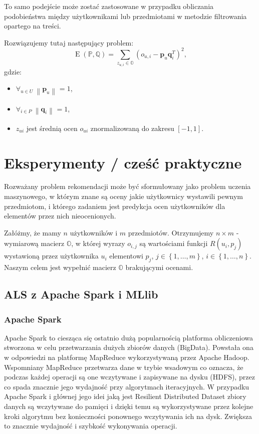 \documentclass[12pt,a4paper]{report}
\newcommand{\set}[1]{\left\lbrace {#1} \right\rbrace}
\newcommand{\norm}[2][]{\left\| {#2} \right\|_{#1}}
\newcommand{\e}[1]{\operatorname{E}\left({#1} \right)}
\begin{document}
To samo podejście może zostać zastosowane w przypadku obliczania podobieństwa między użytkownikami lub przedmiotami w metodzie filtrowania opartego na treści.

Rozwiązujemy tutaj następujący problem:
$$
\e{\mathbb{P}, \mathbb{Q}} = \sum_{z_{u,i} \in \mathbb{O}}(o_{u,i} - \mathbf{p}_u\mathbf{q}_i^T)^2,
$$
gdzie:
\begin{itemize}
\item $\forall_{u \in \mathit{U}} \: \norm{\mathbf{p}_u} = 1$,
\item $\forall_{i \in \mathit{P}} \: \norm{\mathbf{q}_i} = 1$,
\item $z_{ui}$ jest średnią ocen $o_{ui}$ znormalizowaną do zakresu $[-1,1]$.
\end{itemize}

\chapter{Eksperymenty / cześć praktyczne}

Rozważany problem rekomendacji może być sformułowany jako problem uczenia maszynowego, w którym znane są oceny jakie użytkownicy wystawili pewnym przedmiotom, i którego zadaniem jest predykcja ocen użytkowników dla elementów przez nich nieocenionych. 

Załóżmy, że mamy $n$ użytkowników i $m$ przedmiotów. Otrzymujemy $n \times m$ - wymiarową macierz $\mathbb{O}$, w której wyrazy $o_{i,j}$ są wartościami funkcji $R(u_i,p_j)$ wystawioną przez użytkownika $u_i$ elementowi $p_j$, $j \in \set{1, \ldots, m}$, $i \in \set{1, \ldots, n}$. Naszym celem jest wypełnić macierz $\mathbb{O}$ brakującymi ocenami. 


\section{ALS z Apache Spark i MLlib}
\subsection{Apache Spark}
Apache Spark to ciesząca się ostatnio dużą popularnością platforma obliczeniowa stworzona w celu przetwarzania dużych zbiorów danych (BigData). Powstała ona w odpowiedzi na platformę MapReduce wykorzystywaną przez Apache Hadoop. Wspomniany MapReduce przetwarza dane w trybie wsadowym co oznacza, że podczas każdej operacji są one wczytywane i zapisywane na dysku (HDFS), przez co spada znacznie jego wydajność przy algorytmach iteracyjnych. W przypadku Apache Spark i głównej jego idei jaką jest 
Resilient Distributed Dataset zbiory danych są wczytywane do pamięci i dzięki temu są wykorzystywane przez kolejne kroki algorytmu bez konieczności ponownego wczytywania ich na dysk. Zwiększa to znacznie wydajność i szybkość wykonywania operacji.
\end{document}
